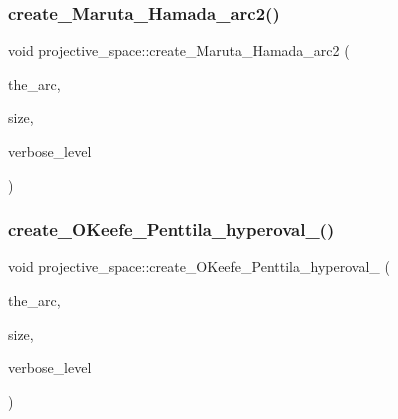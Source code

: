 \mbox{\label{classprojective__space_a93c6b6aabfa555ff94fbbcc89d2735be}} 
\subsubsection{\texorpdfstring{create\+\_\+\+Maruta\+\_\+\+Hamada\+\_\+arc2()}{create\_Maruta\_Hamada\_arc2()}}
{\footnotesize\ttfamily void projective\+\_\+space\+::create\+\_\+\+Maruta\+\_\+\+Hamada\+\_\+arc2 (\begin{DoxyParamCaption}\item[{\mbox{\hyperlink{galois_8h_a09fddde158a3a20bd2dcadb609de11dc}{I\+NT}} $\ast$}]{the\+\_\+arc,  }\item[{\mbox{\hyperlink{galois_8h_a09fddde158a3a20bd2dcadb609de11dc}{I\+NT}} \&}]{size,  }\item[{\mbox{\hyperlink{galois_8h_a09fddde158a3a20bd2dcadb609de11dc}{I\+NT}}}]{verbose\+\_\+level }\end{DoxyParamCaption})}

\mbox{\label{classprojective__space_a4d9a5bb0a19db29dfe77bb3f9f1b8df2}} 
\subsubsection{\texorpdfstring{create\+\_\+\+O\+Keefe\+\_\+\+Penttila\+\_\+hyperoval\+\_()}{create\_OKeefe\_Penttila\_hyperoval\_32()}}
{\footnotesize\ttfamily void projective\+\_\+space\+::create\+\_\+\+O\+Keefe\+\_\+\+Penttila\+\_\+hyperoval\+\_ (\begin{DoxyParamCaption}\item[{\mbox{\hyperlink{galois_8h_a09fddde158a3a20bd2dcadb609de11dc}{I\+NT}} $\ast$}]{the\+\_\+arc,  }\item[{\mbox{\hyperlink{galois_8h_a09fddde158a3a20bd2dcadb609de11dc}{I\+NT}} \&}]{size,  }\item[{\mbox{\hyperlink{galois_8h_a09fddde158a3a20bd2dcadb609de11dc}{I\+NT}}}]{verbose\+\_\+level }\end{DoxyParamCaption})}

